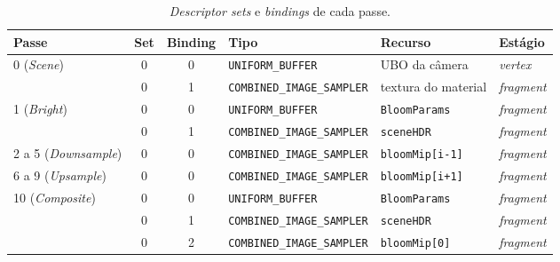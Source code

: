 \begin{table}[H]
    \centering
    \caption{\textit{Descriptor sets} e \textit{bindings} de cada passe.}
    \label{tab:descriptors}
    \vspace{4pt}
    \scriptsize
    \setlength{\tabcolsep}{5pt}
    \begin{tabular}{l c c l l l}
        \toprule
        \textbf{Passe} & \textbf{Set} & \textbf{Binding} & \textbf{Tipo} & \textbf{Recurso} & \textbf{Estágio} \\
        \midrule
        0 (\textit{Scene}) & 0 & 0 & \texttt{UNIFORM\_BUFFER} & UBO da câmera & \textit{vertex} \\
                           & 0 & 1 & \texttt{COMBINED\_IMAGE\_SAMPLER} & textura do material & \textit{fragment} \\
        1 (\textit{Bright}) & 0 & 0 & \texttt{UNIFORM\_BUFFER} & \texttt{BloomParams} & \textit{fragment} \\
                            & 0 & 1 & \texttt{COMBINED\_IMAGE\_SAMPLER} & \texttt{sceneHDR} & \textit{fragment} \\
        2 a 5 (\textit{Downsample}) & 0 & 0 & \texttt{COMBINED\_IMAGE\_SAMPLER} & \texttt{bloomMip[i-1]} & \textit{fragment} \\
        6 a 9 (\textit{Upsample}) & 0 & 0 & \texttt{COMBINED\_IMAGE\_SAMPLER} & \texttt{bloomMip[i+1]} & \textit{fragment} \\
        10 (\textit{Composite}) & 0 & 0 & \texttt{UNIFORM\_BUFFER} & \texttt{BloomParams} & \textit{fragment} \\
                                & 0 & 1 & \texttt{COMBINED\_IMAGE\_SAMPLER} & \texttt{sceneHDR} & \textit{fragment} \\
                                & 0 & 2 & \texttt{COMBINED\_IMAGE\_SAMPLER} & \texttt{bloomMip[0]} & \textit{fragment} \\
        \bottomrule
    \end{tabular}
\end{table}


